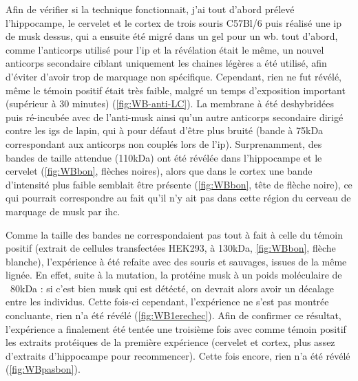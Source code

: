 	Afin de vérifier si la technique fonctionnait, j'ai tout d'abord prélevé l'hippocampe, le cervelet et le cortex de trois souris C57Bl/6 puis réalisé une \gls{ip} de \gls{musk} dessus, qui a ensuite été migré dans un gel pour un \gls{wb}. tout d'abord, comme l'anticorps utilisé pour l'\gls{ip} et la révélation était le même, un nouvel anticorps secondaire ciblant uniquement les chaines légères a été utilisé, afin d'éviter d'avoir trop de marquage non spécifique. Cependant, rien ne fut révélé, même le témoin positif était très faible, malgré un temps d'exposition important (supérieur à 30 minutes) (\cref{fig:WB-anti-LC}). La membrane à été deshybridées puis ré-incubée avec de l'anti-\gls{musk} ainsi qu'un autre anticorps secondaire dirigé contre les \glspl{ig} de lapin, qui à pour défaut d'être plus bruité (bande à 75kDa correspondant aux anticorps non couplés lors de l'\gls{ip}). Surprenamment, des bandes de taille attendue (110kDa) ont été révélée dans l'hippocampe et le cervelet (\cref{fig:WBbon}, flèches noires), alors que dans le cortex une bande d'intensité plus faible semblait être présente (\cref{fig:WBbon}, tête de flèche noire), ce qui pourrait correspondre au fait qu'il n'y ait pas dans cette région du cerveau de marquage de \gls{musk} par \gls{ihc}. 
	
	Comme la taille des bandes ne correspondaient pas tout à fait à celle du témoin positif (extrait de cellules transfectées HEK293, à 130kDa, \cref{fig:WBbon}, flèche blanche), l'expérience à été refaite avec des souris \mcrd et sauvages, issues de la même lignée. En effet, suite à la mutation, la protéine \gls{musk} à un poids moléculaire de ~80kDa : si c'est bien \gls{musk} qui est détécté, on devrait alors avoir un décalage entre les individus. Cette fois-ci cependant, l'expérience ne s'est pas montrée concluante, rien n'a été révélé (\cref{fig:WB1erechec}). Afin de confirmer ce résultat, l'expérience a finalement été tentée une troisième fois avec comme témoin positif les extraits protéiques de la première expérience (cervelet et cortex, plus assez d'extraits d'hippocampe pour recommencer). Cette fois encore, rien n'a été révélé (\cref{fig:WBpasbon}).
	
